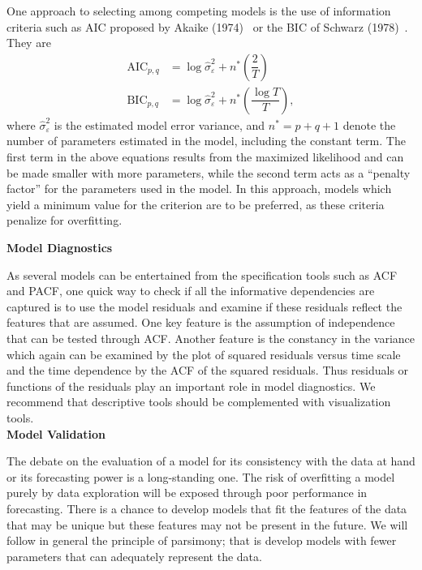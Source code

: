 One approach to selecting among competing models is the use of information criteria such as AIC proposed by Akaike (1974)~\cite{akaike74} or the BIC of Schwarz (1978)~\cite{sch78}. They are
	\begin{equation} \label{eqn:aicbic}
	\begin{split}
	\text{AIC}_{p,q}&= \log \hat{\sigma}_\varepsilon^2 + n^* \left( \dfrac{2}{T} \right) \\
	\text{BIC}_{p,q}&=\log\hat{\sigma}_\varepsilon^2 + n^* \left( \dfrac{\log T}{T} \right),
	\end{split}
	\end{equation}
where $\hat{\sigma}_\varepsilon^2$ is the estimated model error variance, and $n^*= p + q + 1$ denote the number of parameters estimated in the model, including the constant term. The first term in the above equations results from the maximized likelihood and can be made smaller with more parameters, while the second term acts as a ``penalty factor'' for the parameters used in the model. In this approach, models which yield a minimum value for the criterion are to be preferred, as these criteria penalize for overfitting. \twomedskip


\noindent\textbf{Model Diagnostics} \twomedskip


As several models can be entertained from the specification tools such as ACF and PACF, one quick way to check if all the informative dependencies are captured is to use the model residuals and examine if these residuals reflect the features that are assumed. One key feature is the assumption of independence that can be tested through ACF. Another feature is the constancy in the variance which again can be examined by the plot of squared residuals versus time scale and the time dependence by the ACF of the squared residuals. Thus residuals or functions of the residuals play an important role in model diagnostics. We recommend that descriptive tools should be complemented with visualization tools. \\


\noindent \textbf{Model Validation} \twomedskip


The debate on the evaluation of a model for its consistency with the data at hand or its forecasting power is a long-standing one. The risk of overfitting a model purely by data exploration will be exposed through poor performance in forecasting. There is a chance to develop models that fit the features of the data that may be unique but these features may not be present in the future. We will follow in general the principle of parsimony; that is develop models with fewer parameters that can adequately represent the data. 


